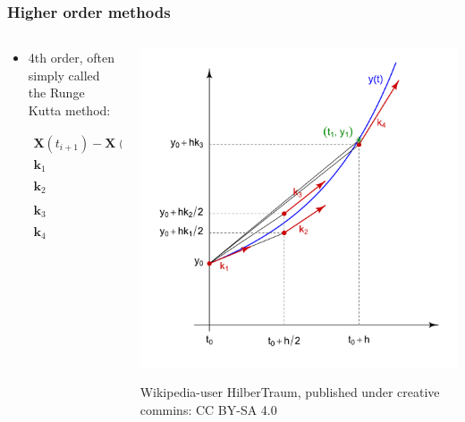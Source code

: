 \documentclass{beamer}
\begin{document}
\begin{frame}
\frametitle{Higher order methods}
\begin{columns}
\begin{column}{0.5\linewidth}
\begin{itemize}
\item<1-> 4th order, often simply called the Runge Kutta method:

\begin{align*}
\mathbf{X}(t_{i+1})-\mathbf{X}(t_{i}) &= \frac{h}{6}(\mathbf{k}_1+2\mathbf{k}_2+2\mathbf{k}_3+\mathbf{k}_4 )\\
\mathbf{k}_1 &= f_{ode}(\mathbf{X}(t_i),t_i)\\
\mathbf{k}_2 &= f_{ode}(\mathbf{X}(t_i)+\frac{h}{2}\mathbf{k}_1,t_i+\frac{h}{2})\\
\mathbf{k}_3 &= f_{ode}(\mathbf{X}(t_i)+\frac{h}{2}\mathbf{k}_2,t_i+\frac{h}{2})\\
\mathbf{k}_4 &= f_{ode}(\mathbf{X}(t_i)+h\mathbf{k}_3,t_i+h).
\end{align*}

\end{itemize}
\end{column}
\begin{column}{0.5\linewidth}
\includegraphics[width=\linewidth]{Runge-Kutta_slopes.pdf}

{\color{gray} Wikipedia-user HilberTraum, published under creative commins: CC BY-SA 4.0}
\end{column}
\end{columns}
\end{frame}
\end{document}
